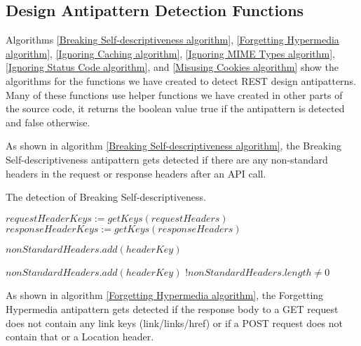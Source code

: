 \subsection{Design Antipattern Detection Functions}

Algorithms \ref{Breaking Self-descriptiveness algorithm}, \ref{Forgetting Hypermedia algorithm}, \ref{Ignoring Caching algorithm}, \ref{Ignoring MIME Types algorithm}, \ref{Ignoring Status Code algorithm}, and \ref{Misusing Cookies algorithm} show the algorithms for the functions we have created to detect REST design antipatterns. Many of these functions use helper functions we have created in other parts of the source code, it returns the boolean value true if the antipattern is detected and false otherwise.

As shown in algorithm \ref{Breaking Self-descriptiveness algorithm}, the Breaking Self-descriptiveness antipattern gets detected if there are any non-standard headers in the request or response headers after an API call.

\begin{algorithm}
\caption{The detection of Breaking Self-descriptiveness.}
\begin{algorithmic}
\State $requestHeaderKeys := getKeys(requestHeaders)$
\State $responseHeaderKeys := getKeys(responseHeaders)$

        \State $nonStandardHeaders.add(headerKey)$
    \EndIf
\EndFor

        \State $nonStandardHeaders.add(headerKey)$
    \EndIf
\EndFor
\State \Return $!nonStandardHeaders.length \neq 0$
\EndFunction
\end{algorithmic}
\label{Breaking Self-descriptiveness algorithm}
\end{algorithm}

As shown in algorithm \ref{Forgetting Hypermedia algorithm}, the Forgetting Hypermedia antipattern gets detected if the response body to a GET request does not contain any link keys (link/links/href) or if a POST request does not contain that or a Location header.

